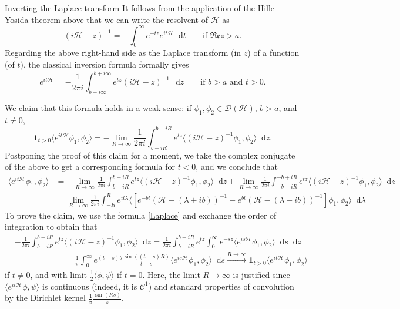 \documentclass[11 pt]{amsart}
\theoremstyle{definition}
\theoremstyle{remark}
\numberwithin{equation}{section}
\newcommand{\dd}{\mathop{}\!\mathrm{d}}
\begin{document}
\medskip
\noindent
\underline{Inverting the Laplace transform} It follows from the application of the Hille-Yosida theorem above that we can write the resolvent of $\mathcal{H}$ as
\begin{equation}
\label{Laplace}
(i\mathcal{H} - z)^{-1} = - \int_0^\infty e^{-tz} e^{it \mathcal{H}}  \dd t \qquad \mbox{if $\mathfrak{Re} z > a$}.
\end{equation}
Regarding the above right-hand side as the Laplace transform (in $z$) of a function (of $t$), the classical inversion formula formally gives
$$
e^{it \mathcal{H}} = - \frac{1}{2\pi i} \int_{b-i \infty}^{b +i\infty} e^{tz} (i\mathcal{H} - z)^{-1} \, \dd z \qquad \mbox{if $b>a$ and $t>0$.}
$$

We claim that this formula holds in a weak sense: if $\phi_1,\phi_2 \in \mathcal{D}(\mathcal{H})$, $b>a$, and $t \neq 0$,
$$
\mathbf{1}_{t>0}  \langle e^{it\mathcal{H}} \phi_1 , \phi_2 \rangle = - \lim_{R \to \infty} \frac{1}{2\pi i} \int_{b - iR}^{b+iR} e^{tz} \langle (i\mathcal{H} - z)^{-1} \phi_1 , \phi_2 \rangle \dd z.
$$
Postponing the proof of this claim for a moment, we take the complex conjugate of the above to get a corresponding formula for $t<0$, and we conclude that
\begin{equation}
\label{coccinelle}
\begin{split}
 \langle e^{it\mathcal{H}} \phi_1 , \phi_2 \rangle & =  - \lim_{R \to \infty} \frac{1}{2\pi i} \int_{b - iR}^{b+iR} e^{tz} \langle (i\mathcal{H} - z)^{-1} \phi_1 , \phi_2 \rangle \dd z +  \lim_{R \to \infty} \frac{1}{2\pi i} \int_{-b - iR}^{-b+iR} e^{tz} \langle (i\mathcal{H} - z)^{-1} \phi_1 , \phi_2 \rangle \dd z \\
& = \lim_{R \to \infty} \frac{1}{2\pi i} \int_{-R}^R e^{it\lambda} \langle \left[ e^{-bt} (\mathcal{H} - (\lambda+ib))^{-1} -  e^{bt} (\mathcal{H} - (\lambda - ib))^{-1}  \right] \phi_1,\phi_2 \rangle \dd \lambda
\end{split}
\end{equation}
To prove the claim, we use the formula \eqref{Laplace} and exchange the order of integration to obtain that
\begin{align*}
& - \frac{1}{2\pi i} \int_{b - iR}^{b+iR} e^{tz} \langle (i\mathcal{H} - z)^{-1} \phi_1 , \phi_2 \rangle \dd z =  \frac{1}{2\pi i} \int_{b - iR}^{b+iR} e^{tz} \int_0^\infty e^{-sz} \langle e^{is \mathcal{H}} \phi_1, \phi_2 \rangle \dd s \dd z \\
 & \qquad  \qquad \qquad = \frac{1}{\pi} \int_0^\infty e^{(t-s) b} \frac{\sin((t-s)R)}{t-s} \langle e^{is \mathcal{H}} \phi_1, \phi_2 \rangle \dd s \overset{R \to \infty}{\longrightarrow} \mathbf{1}_{t>0}  \langle e^{it\mathcal{H}} \phi_1 , \phi_2 \rangle
\end{align*}
if $t \neq 0$, and with limit $\frac{1}{2} \langle \phi , \psi \rangle$ if $t=0$. Here, the limit $R\to \infty$ is justified since $\langle e^{it\mathcal{H}} \phi , \psi \rangle$ is continuous (indeed, it is $\mathcal{C}^1$) and standard properties of convolution by the Dirichlet kernel $\frac{1}{\pi} \frac{\sin (Rs)}{s}$.
\end{document}
